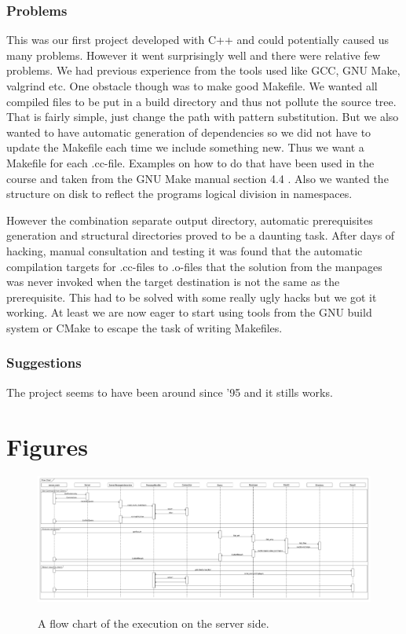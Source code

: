 \documentclass[10pt, a4paper]{article}
\begin{document}
\subsubsection{Problems}
This was our first project developed with C++ and could potentially caused us many problems. However it went surprisingly well and there were relative few problems. We had previous experience from the tools used like GCC, GNU Make, valgrind etc. One obstacle though was to make good Makefile. We wanted all compiled files to be put in a build directory and thus not pollute the source tree. That is fairly simple, just change the path with pattern substitution. But we also wanted to have automatic generation of dependencies so we did not have to update the Makefile each time we include something new. Thus we want a Makefile for each .cc-file. Examples on how to do that have been used in the course and taken from the GNU Make manual section 4.4 \cite{makeman}. Also we wanted the structure on disk to reflect the programs logical division in namespaces.

However the combination separate output directory, automatic prerequisites generation and structural directories proved to be a daunting task. After days of hacking, manual consultation and testing it was found that the automatic compilation targets for .cc-files to .o-files that the solution from the manpages was never invoked when the target destination is not the same as the prerequisite. This had to be solved with some really ugly hacks but we got it working. At least we are now eager to start using tools from the GNU build system or CMake to escape the task of writing Makefiles.

\subsubsection{Suggestions}
The project seems to have been around since '95 and it stills works.

\appendix



\section{Figures}
\begin{figure}[hbt]
\begin{center}
\vspace*{-1.8in}
\label{flow+chart}
\includegraphics[scale=0.3,angle=90]{img/flow-chart.pdf}
\thispagestyle{empty}	%
\end{center}
\caption{A flow chart of the execution on the server side.}
\end{figure}
\end{document}
